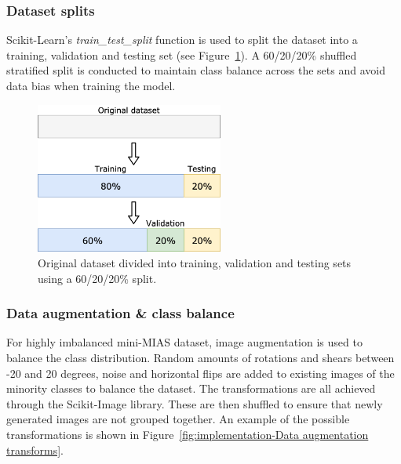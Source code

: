 
\subsubsection{Dataset splits}

Scikit-Learn's \textit{train\_test\_split} function is used to split the dataset into a training, validation and testing set (see Figure~\ref{fig:dataset_splits}). A 60/20/20\% shuffled stratified split is conducted to maintain class balance across the sets and avoid data bias when training the model. 

\begin{figure}[ht]
\centerline{\includegraphics[width=0.55\textwidth]{figures/implementation/dataset_splits.png}}
\caption{\label{fig:dataset_splits}Original dataset divided into training, validation and testing sets using a 60/20/20\% split.}
\end{figure}


\subsubsection{Data augmentation \& class balance}

For highly imbalanced mini-MIAS dataset, image augmentation is used to balance the class distribution. Random amounts of rotations and shears between -20 and 20 degrees, noise and horizontal flips are added to existing images of the minority classes to balance the dataset. The transformations are all achieved through the Scikit-Image library. These are then shuffled to ensure that newly generated images are not grouped together. An example of the possible transformations is shown in Figure~\ref{fig:implementation-Data augmentation transforms}.


